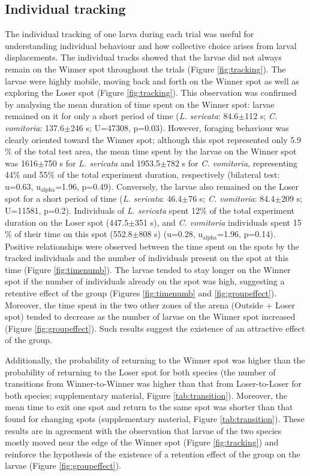 		\subsection{Individual tracking}
The individual tracking of one larva during each trial was useful for understanding individual behaviour and how collective choice arises from larval displacements. The individual tracks showed that the larvae did not always remain on the Winner spot throughout the trials (Figure \ref{fig:tracking}). The larvae were highly mobile, moving back and forth on the Winner spot as well as exploring the Loser spot (Figure \ref{fig:tracking}). This observation was confirmed by analysing the mean duration of time spent on the Winner spot: larvae remained on it for only a short period of time (\textit{L. sericata}: 84.6$\pm$112 s; \textit{C. vomitoria}: 137.6$\pm$246 s; U=47308, p=0.03). However, foraging behaviour was clearly oriented toward the Winner spot; although this spot represented only 5.9$\%$ of the total test area, the mean time spent by the larvae on the Winner spot was 1616$\pm$750 s for \textit{L. sericata} and 1953.5$\pm$782 s for \textit{C. vomitoria}, representing 44$\%$ and 55$\%$ of the total experiment duration, respectively (bilateral test: u=0.63, $\text{u}_{\text{alpha}}$=1.96, p=0.49). Conversely, the larvae also remained on the Loser spot for a short period of time (\textit{L. sericata}: 46.4$\pm$76 s; \textit{C. vomitoria}: 84.4$\pm$209 s; U=11581, p=0.2). Individuals of \textit{L. sericata} spent 12$\%$ of the total experiment duration on the Loser spot (447.5$\pm$351 s), and \textit{C. vomitoria} individuals spent 15$\%$ of their time on this spot (552.8$\pm$808 s) (u=0.28, $\text{u}_{\text{alpha}}$=1.96, p=0.14). Positive relationships were observed between the time spent on the spots by the tracked individuals and the number of individuals present on the spot at this time (Figure \ref{fig:timenumb}). The larvae tended to stay longer on the Winner spot if the number of individuals already on the spot was high, suggesting a retentive effect of the group (Figures \ref{fig:timenumb} and \ref{fig:groupeffect}). Moreover, the time spent in the two other zones of the arena (Outside + Loser spot) tended to decrease as the number of larvae on the Winner spot increased (Figure \ref{fig:groupeffect}). Such results suggest the existence of an attractive effect of the group.

Additionally, the probability of returning to the Winner spot was higher than the probability of returning to the Loser spot for both species (the number of transitions from Winner-to-Winner was higher than that from Loser-to-Loser for both species; supplementary material, Figure \ref{tab:transition}). Moreover, the mean time to exit one spot and return to the same spot was shorter than that found for changing spots (supplementary material, Figure \ref{tab:transition}). These results are in agreement with the observation that larvae of the two species mostly moved near the edge of the Winner spot (Figure \ref{fig:tracking}) and reinforce the hypothesis of the existence of a retention effect of the group on the larvae (Figure \ref{fig:groupeffect}).

